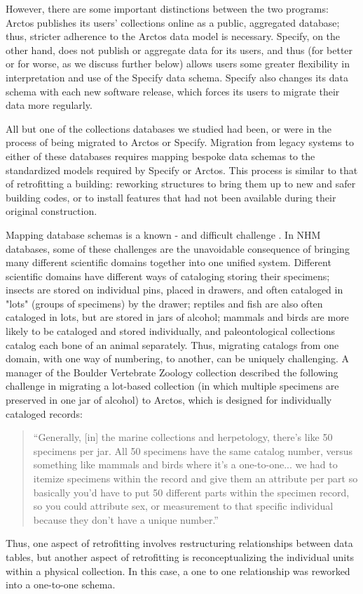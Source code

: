 However, there are some important distinctions between the two programs: Arctos publishes its users’ collections online as a public, aggregated database; thus, stricter adherence to the Arctos data model is necessary. Specify, on the other hand, does not publish or aggregate data for its users, and thus (for better or for worse, as we discuss further below) allows users some greater flexibility in interpretation and use of the Specify data schema. Specify also changes its data schema with each new software release, which forces its users to migrate their data more regularly.

All but one of the collections databases we studied had been, or were in the process of being migrated to Arctos or Specify. Migration from legacy systems to either of these databases requires mapping bespoke data schemas to the standardized models required by Specify or Arctos. This process is similar to that of retrofitting a building: reworking structures to bring them up to new and safer building codes, or to install features that had not been available during their original construction. 

Mapping database schemas is a known - and difficult challenge \cite{Batini_1986}. In NHM databases, some of these challenges are the unavoidable consequence of bringing many different scientific domains together into one unified system. Different scientific domains have different ways of cataloging storing their specimens; insects are stored on individual pins, placed in drawers, and often cataloged in "lots" (groups of specimens) by the drawer; reptiles and fish are also often cataloged in lots, but are stored in jars of alcohol; mammals and birds are more likely to be cataloged and stored individually, and paleontological collections catalog each bone of an animal separately. Thus, migrating catalogs from one domain, with one way of numbering, to another, can be uniquely challenging. A manager of the Boulder Vertebrate Zoology collection described the following challenge in migrating a lot-based collection (in which multiple specimens are preserved in one jar of alcohol) to Arctos, which is designed for individually cataloged records:
\begin{quote}
“Generally, [in] the marine collections and herpetology, there's like 50 specimens per jar. All 50 specimens have the same catalog number, versus something like mammals and birds where it's a one-to-one... we had to itemize specimens within the record and give them an attribute per part so basically you'd have to put 50 different parts within the specimen record, so you could attribute sex, or measurement to that specific individual because they don't have a unique number.”
\end{quote}
Thus, one aspect of retrofitting involves restructuring relationships between data tables, but another aspect of retrofitting is reconceptualizing the individual units within a physical collection. In this case, a one to one relationship was reworked into a one-to-one schema.

